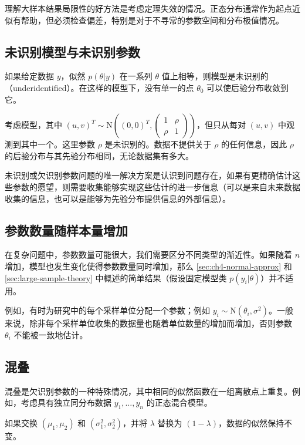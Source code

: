 理解大样本结果局限性的好方法是考虑定理失效的情况。正态分布通常作为起点近似有帮助，但必须检查偏差，特别是对于不寻常的参数空间和分布极值情况。

\subsection{未识别模型与未识别参数}

如果给定数据 $y$，似然 $p(\theta | y)$ 在一系列 $\theta$ 值上相等，则模型是未识别的（underidentified）。在这样的模型下，没有单一的点 $\theta_0$ 可以使后验分布收敛到它。

\begin{Example}[相关系数的未识别性]
  考虑模型，其中 $(u, v)^T \sim \mathrm{N}((0, 0)^T, \begin{pmatrix} 1 & \rho \\ \rho & 1 \end{pmatrix})$，但只从每对 $(u, v)$ 中观测到其中一个。这里参数 $\rho$ 是未识别的。数据不提供关于 $\rho$ 的任何信息，因此 $\rho$ 的后验分布与其先验分布相同，无论数据集有多大。
\end{Example}

未识别或欠识别参数问题的唯一解决方案是认识到问题存在，如果有更精确估计这些参数的愿望，则需要收集能够实现这些估计的进一步信息（可以是来自未来数据收集的信息，也可以是能够为先验分布提供信息的外部信息）。

\subsection{参数数量随样本量增加}

在复杂问题中，参数数量可能很大，我们需要区分不同类型的渐近性。如果随着 $n$ 增加，模型也发生变化使得参数数量同时增加，那么 \cref{sec:ch4-normal-approx} 和 \cref{sec:large-sample-theory} 中概述的简单结果（假设固定模型类 $p(y_i|\theta)$）并不适用。

例如，有时为研究中的每个采样单位分配一个参数；例如 $y_i \sim \mathrm{N}(\theta_i, \sigma^2)$。一般来说，除非每个采样单位收集的数据量也随着单位数量的增加而增加，否则参数 $\theta_i$ 不能被一致地估计。

\subsection{混叠}

混叠是欠识别参数的一种特殊情况，其中相同的似然函数在一组离散点上重复。例如，考虑具有独立同分布数据 $y_1, \ldots, y_n$ 的正态混合模型。

如果交换 $(\mu_1, \mu_2)$ 和 $(\sigma_1^2, \sigma_2^2)$，并将 $\lambda$ 替换为 $(1-\lambda)$，数据的似然保持不变。

